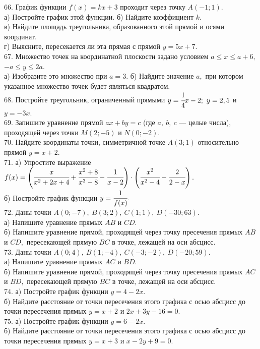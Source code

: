 \documentclass[12pt]{article}
\begin{document}
66. График функции $f(x)=kx+3$ проходит через точку $A(-1;1).$\\
а) Постройте график этой функции. б) Найдите коэффициент $k.$\\
в) Найдите площадь треугольника, образованного этой прямой и осями координат.\\
г) Выясните, пересекается ли эта прямая с прямой $y=5x+7.$\\
67. Множество точек на координатной плоскости задано условием $a\le x \le a+6,$\\
$-a \le y \le 2a.$\\
а) Изобразите это множество при $a=3.$ б) Найдите значение $a,$ при котором указанное множество точек будет являться квадратом.\\
68. Постройте треугольник, ограниченный прямыми $y=\cfrac{1}{4}x-2;\ y=2,5$ и $y=-3x.$\\
69. Запишите уравнение прямой $ax+by=c$ (где $a,\ b,\ c$ --- целые числа), проходящей через точки $M(2;-5)$ и $N(0;-2).$\\
70. Найдите координаты точки, симметричной точке $A(3;1)$ относительно прямой $y=x+2.$\\
71. а) Упростите выражение $f(x)=\left(\cfrac{x}{x^2+2x+4}+\cfrac{x^2+8}{x^3-8}-\cfrac{1}{x-2}\right)\cdot\left(
\cfrac{x^2}{x^2-4}-\cfrac{2}{2-x}\right).$\\
б) Постройте график функции $y=\cfrac{1}{f(x)}.$\\
72. Даны точки $A(0;-7),\ B(3;2),\ C(1;1),\ D(-30;63).$\\
а) Напишите уравнение прямых $AB$ и $CD.$\\
б) Напишите уравнение прямой, проходящей через точку пресечения прямых $AB$ и $CD,$ пересекающей прямую $BC$ в точке, лежащей на оси абсцисс.\\
73. Даны точки $A(0;4),\ B(1;-4),\ C(-3;-2),\ D(-20;59).$\\
а) Напишите уравнение прямых $AC$ и $BD.$\\
б) Напишите уравнение прямой, проходящей через точку пресечения прямых $AC$ и $BD,$ пересекающей прямую $BC$ в точке, лежащей на оси абсцисс.\\
74. а) Постройте график функции $y=4-2x.$\\
б) Найдите расстояние от точки пересечения этого графика с осью абсцисс до точки пересечения прямых $y=x+2$ и $2x+3y-16=0.$\\
75. а) Постройте график функции $y=6-2x.$\\
б) Найдите расстояние от точки пересечения этого графика с осью абсцисс до точки пересечения прямых $y=x+3$ и $x-2y+9=0.$\\
\end{document}
